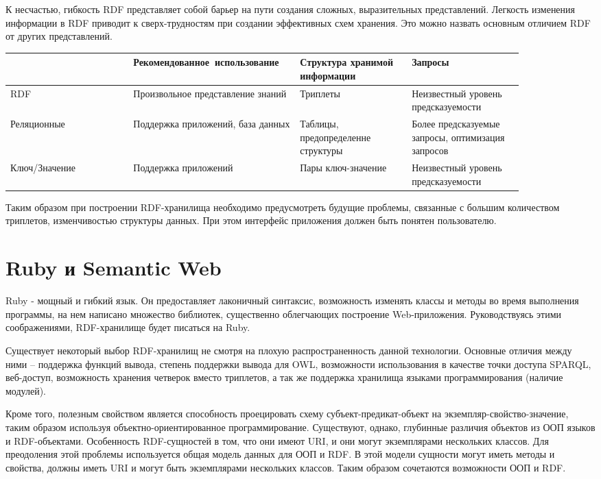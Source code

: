 \documentclass[specialist,subf,href,colorlinks=true
]{disser}
\begin{document}
К несчастью, гибкость RDF представляет собой барьер на пути создания сложных, выразительных представлений. Легкость изменения информации в RDF приводит к сверх-трудностям при создании эффективных схем хранения. Это можно назвать основным отличием RDF от других представлений.

\begin{tabular}{p{0.22\linewidth}|p{0.25\linewidth}|p{0.2\linewidth}|p{0.2\linewidth}}
\hline
& Рекомендованное\ использование & Структура хранимой информации & Запросы  \\
\hline
RDF & Произвольное представление знаний & Триплеты & Неизвестный уровень предсказуемости \\
\hline
Реляционные & Поддержка приложений, база данных & Таблицы, предопределенне структуры & Более предсказуемые запросы, оптимизация запросов \\
\hline
Ключ/Значение & Поддержка приложений& Пары ключ-значение & Неизвестный уровень предсказуемости \\
\hline
\end{tabular}

Таким образом при построении RDF-хранилища необходимо предусмотреть будущие проблемы, связанные с большим количеством триплетов, изменчивостью структуры данных. При этом интерфейс приложения должен быть понятен пользователю.

\chapter{Ruby и Semantic Web}
Ruby - мощный и гибкий язык. Он предоставляет лаконичный синтаксис, возможность изменять классы и методы во время выполнения программы, на нем написано множество библиотек, существенно облегчающих построение Web-приложения. Руководствуясь этими соображениями, RDF-хранилище будет писаться на Ruby.

Существует некоторый выбор RDF-хранилищ не смотря на плохую распространенность данной технологии. Основные отличия между ними – поддержка функций вывода, степень поддержки вывода для OWL, возможности использования в качестве точки доступа SPARQL, веб-доступ, возможность хранения четверок вместо триплетов, а так же поддержка хранилища языками программирования (наличие модулей).

Кроме того, полезным свойством является способность проецировать схему субъект-предикат-объект на экземпляр-свойство-значение, таким образом используя объектно-ориентированное программирование. Существуют, однако, глубинные различия объектов из ООП языков и RDF-объектами. Особенность RDF-сущностей в том, что они имеют URI, и они могут экземплярами нескольких классов. Для преодоления этой проблемы используется общая модель данных для ООП и RDF. В этой модели сущности могут иметь методы и свойства, должны иметь URI и могут быть экземплярами нескольких классов. Таким образом сочетаются возможности ООП и RDF.
\end{document}
